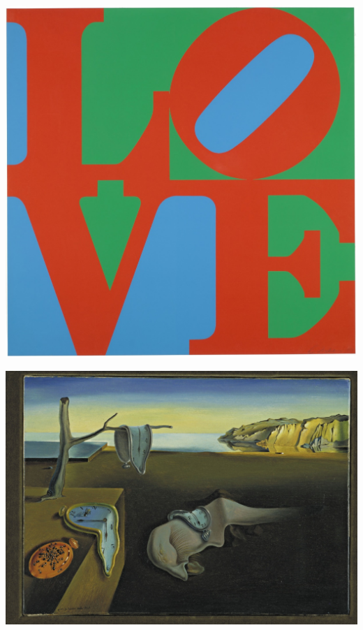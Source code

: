 \documentclass[french]{beamer}
\begin{document}
\begin{frame}{}
\begin{center}
	\includegraphics[height=0.8\textheight]{love}
\end{center}
\end{frame}

\begin{frame}{}
\begin{center}
	\includegraphics[height=0.8\textheight]{dali}
\end{center}
\end{frame}
\end{document}
